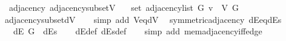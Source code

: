 \begin{isabellebody}
\ {\isacharparenleft}{\kern0pt}\ adjacency{\isacharparenright}{\kern0pt}\ adjacency{\isacharunderscore}{\kern0pt}subset{\isacharunderscore}{\kern0pt}V{\isacharcolon}{\kern0pt}\isanewline
\ \ \ {\isachardoublequoteopen}set\ {\isacharparenleft}{\kern0pt}adjacency{\isacharunderscore}{\kern0pt}list\ G\ v{\isacharparenright}{\kern0pt}\ {\isasymsubseteq}\ V\ G{\isachardoublequoteclose}%
\endisataginvisible
{\isafoldinvisible}%
%
\isadeliminvisible
\isanewline
%
\endisadeliminvisible
%
\isadelimproof
\ \ %
\endisadelimproof
%
\isatagproof
{}\isamarkupfalse%
\ adjacency{\isacharunderscore}{\kern0pt}subset{\isacharunderscore}{\kern0pt}dV\isanewline
\ \ \isamarkupfalse%
\ {\isacharparenleft}{\kern0pt}simp\ add{\isacharcolon}{\kern0pt}\ V{\isacharunderscore}{\kern0pt}eq{\isacharunderscore}{\kern0pt}dV{\isacharparenright}{\kern0pt}%
\endisatagproof
{\isafoldproof}%
%
\isadelimproof
\isanewline
%
\endisadelimproof
%
\isadeliminvisible
\isanewline
%
\endisadeliminvisible
%
\isataginvisible
{}\isamarkupfalse%
\ {\isacharparenleft}{\kern0pt}\ symmetric{\isacharunderscore}{\kern0pt}adjacency{\isacharparenright}{\kern0pt}\ dE{\isacharunderscore}{\kern0pt}eq{\isacharunderscore}{\kern0pt}dEs{\isacharcolon}{\kern0pt}\isanewline
\ \ \ {\isachardoublequoteopen}dE\ G\ {\isacharequal}{\kern0pt}\ dEs{\isachardoublequoteclose}%
\endisataginvisible
{\isafoldinvisible}%
%
\isadeliminvisible
\isanewline
%
\endisadeliminvisible
%
\isadelimproof
\ \ %
\endisadelimproof
%
\isatagproof
{}\isamarkupfalse%
\ dE{\isacharunderscore}{\kern0pt}def\ dEs{\isacharunderscore}{\kern0pt}def\isanewline
\ \ \isamarkupfalse%
\ {\isacharparenleft}{\kern0pt}simp\ add{\isacharcolon}{\kern0pt}\ mem{\isacharunderscore}{\kern0pt}adjacency{\isacharunderscore}{\kern0pt}iff{\isacharunderscore}{\kern0pt}edge{\isacharparenright}{\kern0pt}%
\endisatagproof
{\isafoldproof}%
%
\isadelimproof
\isanewline
%
\endisadelimproof
%
\isadeliminvisible
\isanewline
%
\endisadeliminvisible
%
\isataginvisible
{}\isamarkupfalse%
%
\endisataginvisible
{\isafoldinvisible}%
%
\isadeliminvisible
%
\endisadeliminvisible
%
\end{isabellebody}%
\endinput
